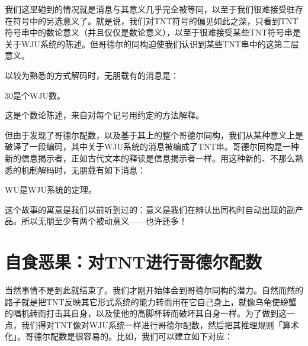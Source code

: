 \documentclass[
  12pt,
  twoside,
  openright,
  oldfontcommands,
]{memoir}
\begin{document}
我们这里碰到的情况就是消息与其意义几乎完全被等同，以至于我们很难接受驻存在符号中的另选意义了。就是说，我们对TNT符号的偏见如此之深，只看到TNT符号串中的数论意义（并且仅仅是数论意义），以至于很难接受某些TNT符号串是关于WJU系统的陈述。但哥德尔的同构迫使我们认识到某些TNT串中的这第二层意义。

以较为熟悉的方式解码时，无朋载有的消息是：

30是个WJU数。

这是个数论陈述，来自对每个记号用约定的方法解释。

但由于发现了哥德尔配数，以及基于其上的整个哥德尔同构，我们从某种意义上是破译了一段编码，其中关于WJU系统的消息被编成了TNT串。哥德尔同构是一种新的信息揭示者，正如古代文本的释读是信息揭示者一样。用这种新的、不那么熟悉的机制解码时，无朋载有如下消息：

WU是WJU系统的定理。

这个故事的寓意是我们以前听到过的：意义是我们在辨认出同构时自动出现的副产品。所以无朋至少有两个被动意义------也许还多！

\section{自食恶果：对TNT进行哥德尔配数}

当然事情不是到此就结束了。我们才刚开始体会到哥德尔同构的潜力。自然而然的路子就是把TNT反映其它形式系统的能力转而用在它自己身上，就像乌龟使螃蟹的唱机转而打击其自身，以及使他的高脚杯转而破坏其自身一样。为了做到这一点，我们得对TNT像对WJU系统一样进行哥德尔配数，然后把其推理规则「算术化」。哥德尔配数是很容易的。比如，我们可以建立如下对应：
\end{document}
